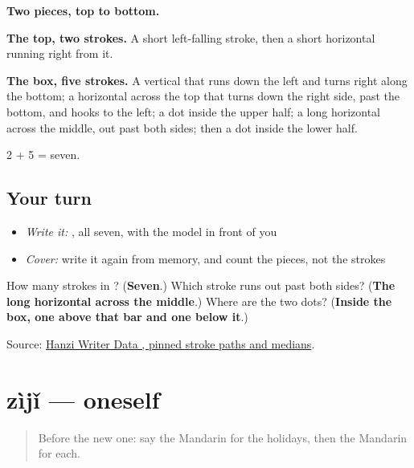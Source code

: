 \begin{quote}
\end{quote}

\textbf{Two pieces, top to bottom.}

\textbf{The top, two strokes.} A short left-falling stroke, then a short horizontal running right from it.

\textbf{The box, five strokes.} A vertical that runs down the left and turns right along the bottom; a horizontal across the top that turns down the right side, past the bottom, and hooks to the left; a dot inside the upper half; a long horizontal across the middle, out past both sides; then a dot inside the lower half.

2 + 5 = seven.

\subsection*{Your turn}
\begin{itemize}
\raggedright
  \item \emph{Write it:} , all seven, with the model in front of you
  \item \emph{Cover:} write it again from memory, and count the pieces, not the strokes
\end{itemize}

\begin{tcolorbox}[breakable,colback=teal!4,colframe=teal!35!black,title={Before you move on}]
How many strokes in ? (\textbf{Seven}.) Which stroke runs out past both sides? (\textbf{The long horizontal across the middle}.) Where are the two dots? (\textbf{Inside the box, one above that bar and one below it}.)

Source: \href{https://raw.githubusercontent.com/chanind/hanzi-writer-data/68d10a4b21150cae5e1ebbd223eed289cf32d90c/data/\%E6\%AF\%8F.json}{Hanzi Writer Data , pinned stroke paths and medians}.
\end{tcolorbox}
\section[zìjǐ]{zìjǐ — oneself}

\label{lesson:ZH-C138-ziji}



\begin{quote}
Before the new one: say the Mandarin for the holidays, then the Mandarin for each.
\end{quote}

